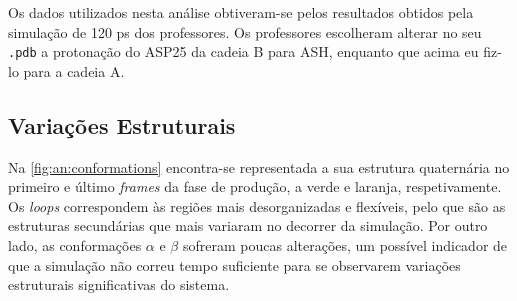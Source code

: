 \documentclass[12pt,a4paper]{article}
\begin{document}
	Os dados utilizados nesta análise obtiveram-se pelos resultados obtidos pela simulação de 120 ps dos professores. Os professores escolheram alterar no seu \verb|.pdb| a protonação do ASP25 da cadeia B para ASH, enquanto que acima eu fiz-lo para a cadeia A.
	
\subsection{Variações Estruturais}\label{sec:variacoes-estruturais}
	Na \cref{fig:an:conformations} encontra-se representada a sua estrutura quaternária no primeiro e último \textit{frames} da fase de produção, a verde e laranja, respetivamente. Os \textit{loops} correspondem às regiões mais desorganizadas e flexíveis, pelo que são as estruturas secundárias que mais variaram no decorrer da simulação. Por outro lado, as conformações $\alpha$ e $\beta$ sofreram poucas alterações, um possível indicador de que a simulação não correu tempo suficiente para se observarem variações estruturais significativas do sistema.
	
\end{document}
